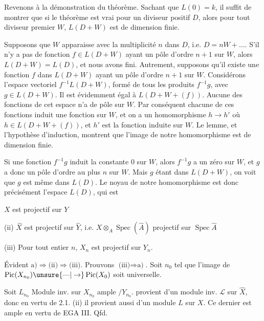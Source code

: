 Revenons à la démonstration du théorème. Sachant que $L(0)=k$, il suffit de montrer que si le théorème est vrai pour un diviseur positif $D$, alors pour tout diviseur premier $W$, $L(D+W)$ est de dimension finie.

Supposons que $W$ apparaisse avec la multiplicité $n$ dans $D$, i.e. $D=nW+\ldots$. S'il n'y a pas de fonction $f\in L(D+W)$ ayant un pôle d'ordre $n+1$ sur $W$, alors $L(D+W)=L(D)$, et nous avons fini. Autrement, supposons qu'il existe une fonction $f$ dans $L(D+W)$ ayant un pôle d'ordre $n+1$ sur $W$. Considérons l'espace vectoriel $f^{-1}L(D+W)$, formé de tous les produits $f^{-1}g$, avec $g\in L(D+W)$. Il est évidemment égal à $L(D+W+(f))$. Aucune des fonctions de cet espace n'a de pôle sur $W$. Par conséquent chacune de ces fonctions induit une fonction sur $W$, et on a un homomorphisme $h\longrightarrow h'$ où $h\in L(D+W+(f))$, et $h'$ est la fonction induite sur $W$. Le lemme, et l'hypothèse d'induction, montrent que l'image de notre homomorphisme est de dimension finie.

Si une fonction $f^{-1}g$ induit la constante $0$ sur $W$, alors $f^{-1}g$ a un zéro sur $W$, et $g$ a donc un pôle d'ordre au plus $n$ sur $W$. Mais $g$ étant dans $L(D+W)$, on voit que $g$ est même dans $L(D)$. Le noyau de notre homomorphisme est donc précisément l'espace $L(D)$, qui est


 $X$ est projectif sur $Y$

(ii) $\widehat X$ est projectif sur $\widehat Y$, i.e. $X\otimes_A\operatorname{Spec}(\widehat A)$ projectif sur $\operatorname{Spec}\widehat A$

(iii) Pour tout entier $n$, $X_n$ est projectif sur $Y_n$.

Évident $\text{a)}\Rightarrow\text{(ii)}\Rightarrow\text{(iii)}$. Prouvons $\text{(iii)}\Rightarrow\text{a)}$. Soit $n_0$ tel que l'image de $\operatorname{Pic}(X_{n_0})\unsure{\text{---}|\to}\operatorname{Pic}(X_0)$ soit universelle.

Soit $L_{n_0}$ Module inv. sur $X_{n_0}$ ample $/Y_{n_0}$.   provient d'un module inv. $\mathcal L$ sur $\widehat X$, donc en vertu de  2.1. (ii) il provient aussi d'un module  $L$ sur $X$. Ce dernier est ample en vertu de EGA III. Qfd.


